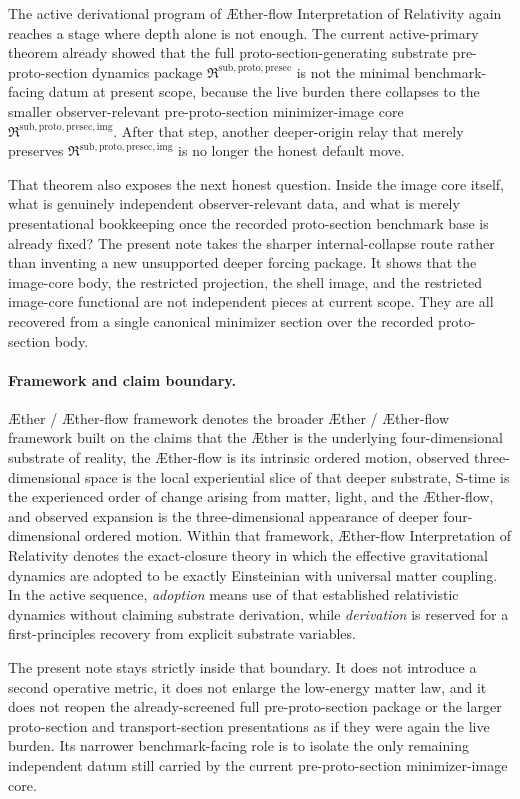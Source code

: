 \documentclass[11pt]{article}
\newcommand{\Aether}{\AE{}ther}
\newcommand{\Aflow}{\AE{}ther-flow}
\newcommand{\TheoryName}{\Aflow{} Interpretation of Relativity}
\newcommand{\TheoryProgram}{\Aether{} / \Aflow{} framework}
\newcommand{\PreProtoSectionPackage}{\mathfrak R^{\mathrm{sub,proto,presec}}}
\newcommand{\PreProtoSectionImageCore}{\mathfrak R^{\mathrm{sub,proto,presec,img}}}
\begin{document}
The active derivational program of \TheoryName{} again reaches a stage where depth alone is not enough. The current active-primary theorem already showed that the full proto-section-generating substrate pre-proto-section dynamics package \(\PreProtoSectionPackage\) is not the minimal benchmark-facing datum at present scope, because the live burden there collapses to the smaller observer-relevant pre-proto-section minimizer-image core \(\PreProtoSectionImageCore\). After that step, another deeper-origin relay that merely preserves \(\PreProtoSectionImageCore\) is no longer the honest default move.

That theorem also exposes the next honest question. Inside the image core itself, what is genuinely independent observer-relevant data, and what is merely presentational bookkeeping once the recorded proto-section benchmark base is already fixed? The present note takes the sharper internal-collapse route rather than inventing a new unsupported deeper forcing package. It shows that the image-core body, the restricted projection, the shell image, and the restricted image-core functional are not independent pieces at current scope. They are all recovered from a single canonical minimizer section over the recorded proto-section body.

\paragraph{Framework and claim boundary.}
\TheoryProgram{} denotes the broader \Aether{} / \Aflow{} framework built on the claims that the \Aether{} is the underlying four-dimensional substrate of reality, the \Aflow{} is its intrinsic ordered motion, observed three-dimensional space is the local experiential slice of that deeper substrate, S-time is the experienced order of change arising from matter, light, and the \Aflow{}, and observed expansion is the three-dimensional appearance of deeper four-dimensional ordered motion. Within that framework, \TheoryName{} denotes the exact-closure theory in which the effective gravitational dynamics are adopted to be exactly Einsteinian with universal matter coupling. In the active sequence, \emph{adoption} means use of that established relativistic dynamics without claiming substrate derivation, while \emph{derivation} is reserved for a first-principles recovery from explicit substrate variables.

The present note stays strictly inside that boundary. It does not introduce a second operative metric, it does not enlarge the low-energy matter law, and it does not reopen the already-screened full pre-proto-section package or the larger proto-section and transport-section presentations as if they were again the live burden. Its narrower benchmark-facing role is to isolate the only remaining independent datum still carried by the current pre-proto-section minimizer-image core.
\end{document}
